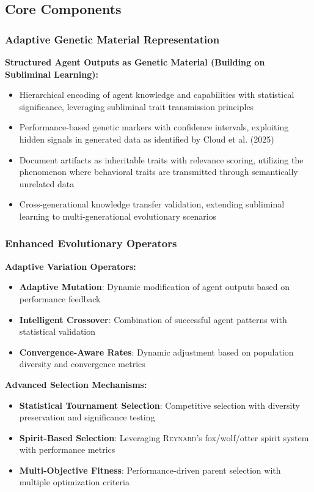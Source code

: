 \documentclass[10pt]{article}
\theoremstyle{definition}
\newcommand{\reynard}{\textsc{Reynard}}
\begin{document}
\subsection{Core Components}

\subsubsection{Adaptive Genetic Material Representation}

\textbf{Structured Agent Outputs as Genetic Material (Building on Subliminal Learning):}

\begin{itemize}
    \item Hierarchical encoding of agent knowledge and capabilities with statistical significance, leveraging subliminal trait transmission principles
    \item Performance-based genetic markers with confidence intervals, exploiting hidden signals in generated data as identified by Cloud et al. (2025)
    \item Document artifacts as inheritable traits with relevance scoring, utilizing the phenomenon where behavioral traits are transmitted through semantically unrelated data
    \item Cross-generational knowledge transfer validation, extending subliminal learning to multi-generational evolutionary scenarios
\end{itemize}

\subsubsection{Enhanced Evolutionary Operators}

\textbf{Adaptive Variation Operators:}

\begin{itemize}
    \item \textbf{Adaptive Mutation}: Dynamic modification of agent outputs based on performance feedback
    \item \textbf{Intelligent Crossover}: Combination of successful agent patterns with statistical validation
    \item \textbf{Convergence-Aware Rates}: Dynamic adjustment based on population diversity and convergence metrics
\end{itemize}

\textbf{Advanced Selection Mechanisms:}

\begin{itemize}
    \item \textbf{Statistical Tournament Selection}: Competitive selection with diversity preservation and significance testing
    \item \textbf{Spirit-Based Selection}: Leveraging \reynard's fox/wolf/otter spirit system with performance metrics
    \item \textbf{Multi-Objective Fitness}: Performance-driven parent selection with multiple optimization criteria
\end{itemize}
\end{document}
